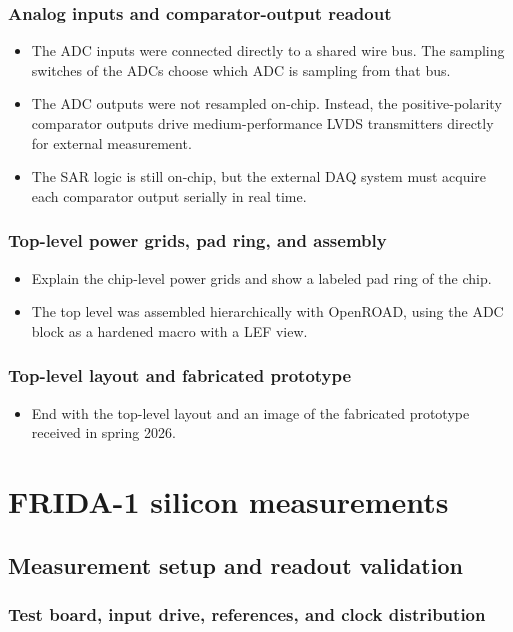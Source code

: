 \documentclass[PhD, UKenglish]{scrbook}
\begin{document}
\subsection{Analog inputs and comparator-output readout}
\begin{itemize}
  \item The ADC inputs were connected directly to a shared wire bus. The sampling switches of the ADCs choose which ADC is sampling from that bus.
  \item The ADC outputs were not resampled on-chip. Instead, the positive-polarity comparator outputs drive medium-performance LVDS transmitters directly for external measurement.
  \item The SAR logic is still on-chip, but the external DAQ system must acquire each comparator output serially in real time.
\end{itemize}
\subsection{Top-level power grids, pad ring, and assembly}
\begin{itemize}
  \item Explain the chip-level power grids and show a labeled pad ring of the chip.
  \item The top level was assembled hierarchically with OpenROAD, using the ADC block as a hardened macro with a LEF view.
\end{itemize}
\subsection{Top-level layout and fabricated prototype}
\begin{itemize}
  \item End with the top-level layout and an image of the fabricated prototype received in spring 2026.
\end{itemize}

\chapter{FRIDA-1 silicon measurements}

\section{Measurement setup and readout validation}
\subsection{Test board, input drive, references, and clock distribution}
\end{document}
